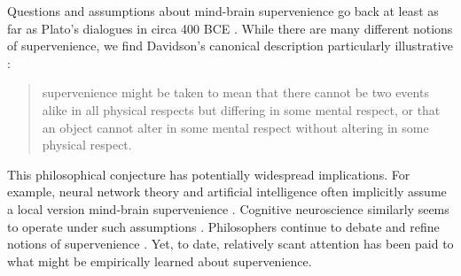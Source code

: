 \documentclass{article}
\begin{document}

\newpage

\noindent Questions and assumptions about mind-brain supervenience go back at least as far as Plato's dialogues in circa 400 BCE \cite{Plato97}.  While there are many different notions of supervenience, we find Davidson's canonical description particularly illustrative \cite{Davidson70}:
\begin{quotation}
 supervenience might be taken to mean that there cannot be two events alike in all physical respects but differing in some mental respect, or that an object cannot alter in some mental respect without altering in some physical respect.
\end{quotation}
This philosophical conjecture has potentially widespread implications.  
For example, neural network theory and artificial intelligence often implicitly assume 
a local version mind-brain supervenience 
\cite{Haykin2008,Ripley2008}. Cognitive neuroscience similarly seems to operate under such assumptions
\cite{Gazzaniga2008}.  Philosophers continue to debate and refine notions of supervenience 
\cite{Kim2007}.  
Yet, to date, relatively scant attention has been paid to what might be empirically learned about supervenience.  
\end{document}
